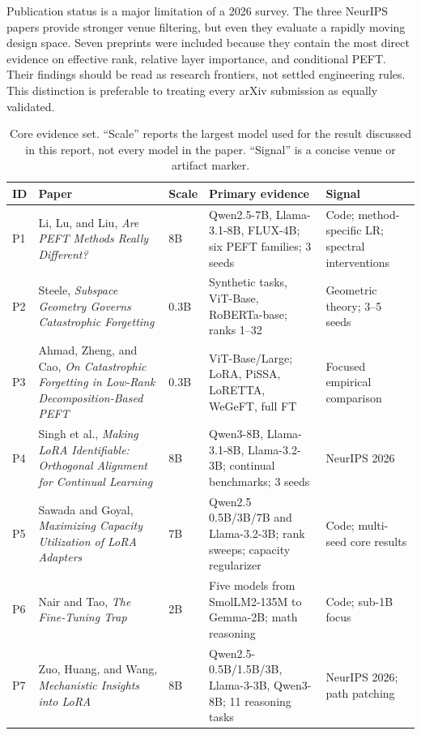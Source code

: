 \documentclass[11pt]{article}
\begin{document}
Publication status is a major limitation of a 2026 survey. The three NeurIPS papers provide stronger venue filtering, but even they evaluate a rapidly moving design space. Seven preprints were included because they contain the most direct evidence on effective rank, relative layer importance, and conditional PEFT. Their findings should be read as research frontiers, not settled engineering rules. This distinction is preferable to treating every arXiv submission as equally validated.

\begin{table}[t]
\centering
\caption{Core evidence set. ``Scale'' reports the largest model used for the result discussed in this report, not every model in the paper. ``Signal'' is a concise venue or artifact marker.}
\label{tab:evidence}
\footnotesize
\begin{tabularx}{\textwidth}{@{}p{}p{}p{}p{}X@{}}
\toprule
\textbf{ID} & \textbf{Paper} & \textbf{Scale} & \textbf{Primary evidence} & \textbf{Signal} \\
\midrule
P1 & Li, Lu, and Liu, \emph{Are PEFT Methods Really Different?} \cite{li2026different} & 8B & Qwen2.5-7B, Llama-3.1-8B, FLUX-4B; six PEFT families; 3 seeds & Code; method-specific LR; spectral interventions \\
P2 & Steele, \emph{Subspace Geometry Governs Catastrophic Forgetting} \cite{steele2026subspace} & 0.3B & Synthetic tasks, ViT-Base, RoBERTa-base; ranks 1--32 & Geometric theory; 3--5 seeds \\
P3 & Ahmad, Zheng, and Cao, \emph{On Catastrophic Forgetting in Low-Rank Decomposition-Based PEFT} \cite{ahmad2026forgetting} & 0.3B & ViT-Base/Large; LoRA, PiSSA, LoRETTA, WeGeFT, full FT & Focused empirical comparison \\
P4 & Singh et al., \emph{Making LoRA Identifiable: Orthogonal Alignment for Continual Learning} \cite{singh2026soar} & 8B & Qwen3-8B, Llama-3.1-8B, Llama-3.2-3B; continual benchmarks; 3 seeds & NeurIPS 2026 \\
P5 & Sawada and Goyal, \emph{Maximizing Capacity Utilization of LoRA Adapters} \cite{sawada2026capacity} & 7B & Qwen2.5 0.5B/3B/7B and Llama-3.2-3B; rank sweeps; capacity regularizer & Code; multi-seed core results \\
P6 & Nair and Tao, \emph{The Fine-Tuning Trap} \cite{nair2026trap} & 2B & Five models from SmolLM2-135M to Gemma-2B; math reasoning & Code; sub-1B focus \\
P7 & Zuo, Huang, and Wang, \emph{Mechanistic Insights into LoRA} \cite{zuo2026mechanistic} & 8B & Qwen2.5-0.5B/1.5B/3B, Llama-3-3B, Qwen3-8B; 11 reasoning tasks & NeurIPS 2026; path patching \\

\end{tabularx}
\end{table}
\end{document}
